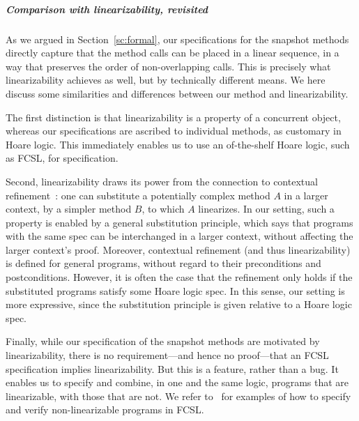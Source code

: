 \subparagraph*{Comparison with linearizability, revisited}
  
As we argued in Section~\ref{sc:formal}, our specifications for the
snapshot methods directly capture that the method calls can be placed
in a linear sequence, in a way that preserves the order of
non-overlapping calls. This is precisely what linearizability achieves
as well, but by technically different means. We here discuss some
similarities and differences between our method and linearizability.

The first distinction is that linearizability is a property of a
concurrent object, whereas our specifications are ascribed to
individual methods, as customary in Hoare logic. This immediately
enables us to use an of-the-shelf Hoare logic, such as FCSL, for
specification. 

Second, linearizability draws its power from the connection to
contextual refinement~\cite{FilipovicOHRW+TCS10}: one can substitute a
potentially complex method $A$ in a larger context, by a simpler
method $B$, to which $A$ linearizes. In our setting, such a property
is enabled by a general substitution principle, which says that
programs with the same spec can be interchanged in a larger context,
without affecting the larger context's proof. Moreover, contextual
refinement (and thus linearizability) is defined for general programs,
without regard to their preconditions and postconditions. However, it
is often the case that the refinement only holds if the substituted
programs satisfy some Hoare logic spec. In this sense, our setting is
more expressive, since the substitution principle is given relative to
a Hoare logic spec.

Finally, while our specification of the snapshot methods are motivated
by linearizability, there is no requirement---and hence no
proof---that an FCSL specification implies linearizability. But this
is a feature, rather than a bug. It enables us to specify and combine,
in one and the same logic, programs that are linearizable, with those
that are not. We refer to~\cite{SergeyNBD+OOPSLA16} for examples of
how to specify and verify non-linearizable programs in FCSL.


